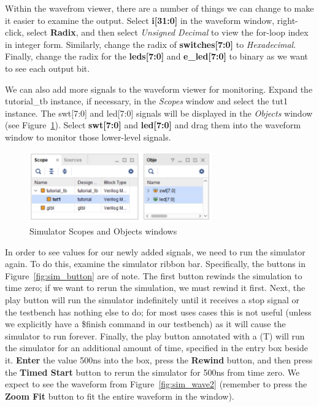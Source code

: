 \documentclass[11pt]{article}
\begin{document}
Within the wavefrom viewer, there are a number of things we can change to make it easier to examine the output. Select \textbf{i[31:0]} in the waveform window, right-click, select \textbf{Radix}, and then select \textit{Unsigned Decimal} to view the for-loop index in integer form. Similarly, change the radix of \textbf{switches[7:0]} to \textit{Hexadecimal}. Finally, change the radix for the \textbf{leds[7:0]} and \textbf{e\_led[7:0]} to binary as we want to see each output bit.

We can also add more signals to the waveform viewer for monitoring. Expand the tutorial\_tb instance, if necessary, in the \textit{Scopes} window and select the tut1 instance. The swt[7:0] and led[7:0] signals will be displayed in the \textit{Objects} window (see Figure~\ref{fig:sim_scope}). Select \textbf{swt[7:0]} and \textbf{led[7:0]} and drag them into the waveform window to monitor those lower-level signals.

\begin{figure}[!h]
    \centering
    \includegraphics[width=0.7\textwidth]{images/sim_scope.png}
    \caption{Simulator Scopes and Objects windows}
    \label{fig:sim_scope}
\end{figure}

In order to see values for our newly added signals, we need to run the simulator again. To do this, examine the simulator ribbon bar. Specifically, the buttons in Figure~\ref{fig:sim_button} are of note. The first button rewinds the simulation to time zero; if we want to rerun the simulation, we must rewind it first. Next, the play button will run the simulator indefinitely until it receives a stop signal or the testbench has nothing else to do; for most uses cases this is not useful (unless we explicitly have a \$finish command in our testbench) as it will cause the simulator to run forever. Finally, the play button annotated with a (T) will run the simulator for an additional amount of time, specified in the entry box beside it. \textbf{Enter} the value 500ns into the box, press the \textbf{Rewind} button, and then press the \textbf{Timed Start} button to rerun the simulator for 500ns from time zero. We expect to see the waveform from Figure~\ref{fig:sim_wave2} (remember to press the \textbf{Zoom Fit} button to fit the entire waveform in the window).
\end{document}
